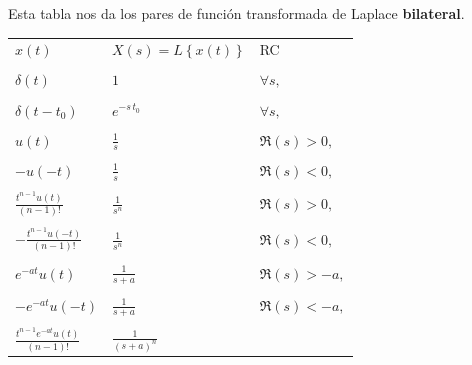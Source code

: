Esta tabla nos da los pares de funci\'{o}n transformada de Laplace \textbf{bilateral}.

\begin{center}
\begin{tabular}{lll}
$x\left( t\right) $     & $X\left( s\right) =L\left\{ x(t)\right\} $    & RC    \\ 
                        &                                               &       \\      
$\delta \left( t\right) $ & $1$                                         & $\forall s,$ \\ 
                        &                        &       \\
$\delta \left( t-t_{0}\right) $ & $e^{-s \, t_{0}}$
& $\forall s,$ \\ 
                        &                        &       \\
$u\left( t\right) $     & $\frac{1}{s}$                                 & $\Re\left( s\right) >0,$ \\ 
                        &                                               &       \\
$-u\left( -t\right) $   & $\frac{1}{s}$                                 & $\Re\left( s\right) <0,$ \\ 
                        &                                               &       \\
$\frac{t^{n-1}u\left( t\right) }{\left( n-1\right) !}$ & $\frac{1}{s^n}$ & $\Re\left( s\right) >0,$ \\ 
                        &                                               &       \\
$-\frac{t^{n-1}u\left( -t\right) }{\left( n-1\right) !}$ & $\frac{1}{s^n}$ & $\Re\left( s\right) <0,$ \\ 
                        &                                               &       \\
$e^{-at}u\left( t\right) $ & $\frac{1}{s+a}$                            & $\Re\left( s\right)>-a,$ \\ 
                        &                                               &       \\
$-e^{-at}u\left( -t\right) $ & $\frac{1}{s+a}$                          & $\Re\left( s\right)<-a,$ \\ 
                        &                                               &       \\
$\frac{t^{n-1}e^{-at}u\left( t\right) }{\left( n-1\right) !}$   & $\frac{1}{\left( s+a\right) ^n}$ & 

\end{tabular}
\end{center}
